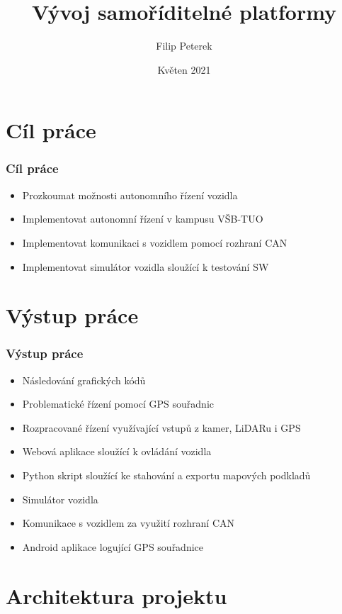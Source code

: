 \documentclass{beamer}
\title{Vývoj samoříditelné platformy}
\author{Filip Peterek}
\institute{Vysoká škola Báňská - Technická univerzita Ostrava}
\date{Květen 2021}
\begin{document}
\frame{\titlepage}

\section{Cíl práce}
\begin{frame}
    \frametitle{Cíl práce}

    \begin{itemize}
        \item Prozkoumat možnosti autonomního řízení vozidla
        \item Implementovat autonomní řízení v kampusu VŠB-TUO
        \item Implementovat komunikaci s vozidlem pomocí rozhraní CAN
        \item Implementovat simulátor vozidla sloužící k testování SW
    \end{itemize}

\end{frame}

\section{Výstup práce}
\begin{frame}
    \frametitle{Výstup práce}
    
    \begin{itemize}
        \item Následování grafických kódů
        \item Problematické řízení pomocí GPS souřadnic
        \item Rozpracované řízení využívající vstupů z kamer, LiDARu i GPS
        \item Webová aplikace sloužící k ovládání vozidla
        \item Python skript sloužící ke stahování a exportu mapových podkladů
        \item Simulátor vozidla
        \item Komunikace s vozidlem za využití rozhraní CAN
        \item Android aplikace logující GPS souřadnice
    \end{itemize}
\end{frame}

\section{Architektura projektu}
\end{document}
